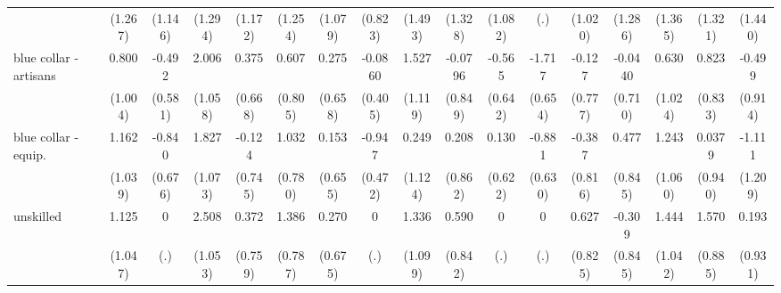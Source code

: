 {\begin{tabular}{l*{16}{c}}
                    &     (1.267)         &     (1.146)         &     (1.294)         &     (1.172)         &     (1.254)         &     (1.079)         &     (0.823)         &     (1.493)         &     (1.328)         &     (1.082)         &         (.)         &     (1.020)         &     (1.286)         &     (1.365)         &     (1.321)         &     (1.440)         \\
[1em]
blue collar - artisans&       0.800         &      -0.492         &       2.006         &       0.375         &       0.607         &       0.275         &     -0.0860         &       1.527         &     -0.0796         &      -0.565         &      -1.717\sym{**} &      -0.127         &     -0.0440         &       0.630         &       0.823         &      -0.499         \\
                    &     (1.004)         &     (0.581)         &     (1.058)         &     (0.668)         &     (0.805)         &     (0.658)         &     (0.405)         &     (1.119)         &     (0.849)         &     (0.642)         &     (0.654)         &     (0.777)         &     (0.710)         &     (1.024)         &     (0.833)         &     (0.914)         \\
[1em]
blue collar - equip.&       1.162         &      -0.840         &       1.827         &      -0.124         &       1.032         &       0.153         &      -0.947\sym{*}  &       0.249         &       0.208         &       0.130         &      -0.881         &      -0.387         &       0.477         &       1.243         &      0.0379         &      -1.111         \\
                    &     (1.039)         &     (0.676)         &     (1.073)         &     (0.745)         &     (0.780)         &     (0.655)         &     (0.472)         &     (1.124)         &     (0.862)         &     (0.622)         &     (0.630)         &     (0.816)         &     (0.845)         &     (1.060)         &     (0.940)         &     (1.209)         \\
[1em]
unskilled           &       1.125         &           0         &       2.508\sym{*}  &       0.372         &       1.386         &       0.270         &           0         &       1.336         &       0.590         &           0         &           0         &       0.627         &      -0.309         &       1.444         &       1.570         &       0.193         \\
                    &     (1.047)         &         (.)         &     (1.053)         &     (0.759)         &     (0.787)         &     (0.675)         &         (.)         &     (1.099)         &     (0.842)         &         (.)         &         (.)         &     (0.825)         &     (0.845)         &     (1.042)         &     (0.885)         &     (0.931)         \\

\end{tabular}}
